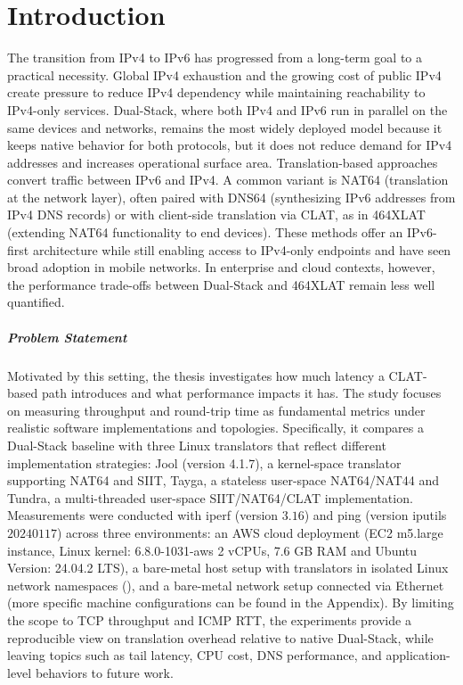 \chapter{Introduction}
The transition from IPv4 to IPv6 has progressed from a long-term goal to a practical necessity. Global IPv4 exhaustion and the growing cost of public IPv4 create pressure to reduce IPv4 dependency while maintaining reachability to IPv4-only services\cite{7737362,LEVIN20141059}. 
Dual-Stack, where both IPv4 and IPv6 run in parallel on the same devices and networks, remains the most widely deployed model because it keeps native behavior for both protocols, but it does not reduce demand for IPv4 addresses and increases operational surface area\cite{rfc4213}. 
Translation-based approaches convert traffic between IPv6 and IPv4. A common variant is NAT64 (translation at the network layer), often paired with DNS64 (synthesizing IPv6 addresses from IPv4 DNS records) or with client-side translation via CLAT, as in 464XLAT (extending NAT64 functionality to end devices). These methods offer an IPv6-first architecture while still enabling access to IPv4-only endpoints and have seen broad adoption in mobile networks\cite{rfc6146,rfc6147,rfc6877}. In enterprise and cloud contexts, however, the performance trade-offs between Dual-Stack and 464XLAT remain less well quantified.


\paragraph{Problem Statement}

Motivated by this setting, 
the thesis investigates how much latency a CLAT-based path introduces and what performance impacts it has. The study focuses on measuring throughput and round-trip time as fundamental metrics under realistic software implementations and topologies. Specifically, it compares a Dual-Stack baseline
with three Linux translators that reflect different implementation strategies: Jool (version 4.1.7), a kernel-space translator supporting NAT64 and SIIT\cite{jool_introduction}, Tayga, a stateless user-space NAT64/NAT44\cite{palrd_tayga_readme,Repas_Farnadi_Lencse_2014} and Tundra, a multi-threaded user-space SIIT/NAT64/CLAT implementation\cite{labuda_tundra_nat64}. Measurements were conducted with
iperf (version $3.16$) and ping (version iputils $20240117$) across three environments: 
an AWS cloud deployment (EC2 m5.large instance, Linux kernel: 6.8.0-1031-aws 2 vCPUs, 7.6 GB RAM and Ubuntu Version: 24.04.2 LTS), a bare-metal host setup with translators in isolated Linux network namespaces (), and a bare-metal network setup connected via Ethernet (more specific machine configurations can be found in the Appendix). By limiting the scope to TCP throughput and ICMP RTT, the experiments provide a reproducible view on translation overhead relative to native Dual-Stack, while leaving topics such as tail latency, CPU cost, DNS performance, and application-level behaviors to future work.

